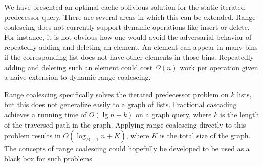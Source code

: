 We have presented an optimal cache oblivious solution for the static 
iterated predecessor query. There are several areas in which this can be extended. 
Range coalescing does not currently support dynamic operations like insert or delete.
For instance, it is not obvious how one would avoid the adversarial behavior of
repeatedly adding and deleting an element.  An element can appear in 
many bins if the corresponding list does not have other
elements in those bins.  Repeatedly 
adding and deleting such an element could cost $\Omega(n)$ work per operation given
a naive extension to dynamic range coalescing.

Range coalescing specifically solves the iterated predecessor problem on $k$ lists, but this does 
not generalize easily to a graph of lists. Fractional cascading achieves a running time of
$O(\lg n + k)$ on a graph query, where $k$ is the length of the traversed path in the graph. 
Applying range coalescing directly to this problem results in $O(\log_{B+1} n + K)$, 
where $K$ is the total size of the graph. The concepts of range coalescing could 
hopefully be developed to be used as a black box for such problems.

